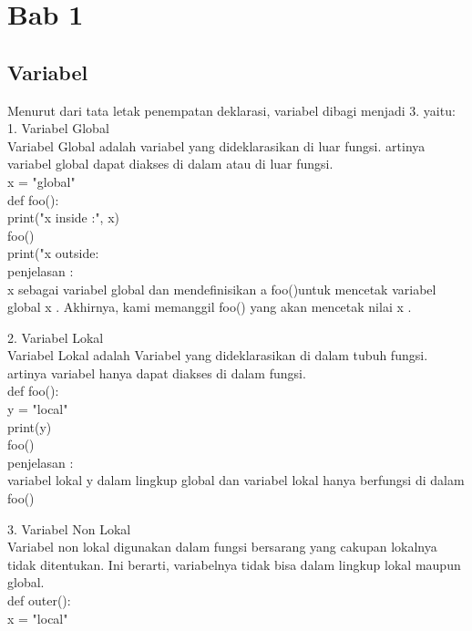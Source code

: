\chapter{Bab 1}

\section{Variabel}

Menurut dari tata letak penempatan deklarasi, variabel dibagi menjadi 3. yaitu:\\
1. Variabel Global\\
Variabel Global adalah variabel yang dideklarasikan di luar fungsi. artinya variabel global dapat diakses di dalam atau di luar fungsi.\\

x = "global"\\

def foo():\\
    print("x inside :", x)\\

foo()\\
print("x outside:\\

penjelasan :\\
x sebagai variabel global dan mendefinisikan a foo()untuk mencetak variabel global x . Akhirnya, kami memanggil foo() yang akan mencetak nilai x .

2. Variabel Lokal\\
Variabel Lokal adalah Variabel yang dideklarasikan di dalam tubuh fungsi. artinya variabel hanya dapat diakses di dalam fungsi.\\

def foo():\\
    y = "local"\\
    print(y)\\

foo()\\

penjelasan :\\
variabel lokal y dalam lingkup global dan variabel lokal hanya berfungsi di dalam  foo()

3. Variabel Non Lokal\\
Variabel non lokal digunakan dalam fungsi bersarang yang cakupan lokalnya tidak ditentukan. Ini berarti, variabelnya tidak bisa dalam lingkup lokal maupun global.\\

def outer():\\
    x = "local"\\
    
